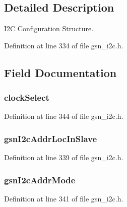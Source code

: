 \subsection{Detailed Description}
I2C Configuration Structure. 

Definition at line 334 of file gsn\_\-i2c.h.



\subsection{Field Documentation}
\hypertarget{a00099_ad3ca20b8730be685c68d651aae8045f1}{
\subsubsection[{clockSelect}]{ {\bf clockSelect}}}
\label{a00099_ad3ca20b8730be685c68d651aae8045f1}


Definition at line 344 of file gsn\_\-i2c.h.

\hypertarget{a00099_ac91130210ef7f9821e15dcdfc901ac08}{
\subsubsection[{gsnI2cAddrLocInSlave}]{ {\bf gsnI2cAddrLocInSlave}}}
\label{a00099_ac91130210ef7f9821e15dcdfc901ac08}


Definition at line 339 of file gsn\_\-i2c.h.

\hypertarget{a00099_a3221d97c6ba51effe1e052f70d45fab9}{
\subsubsection[{gsnI2cAddrMode}]{ {\bf gsnI2cAddrMode}}}
\label{a00099_a3221d97c6ba51effe1e052f70d45fab9}


Definition at line 341 of file gsn\_\-i2c.h.

